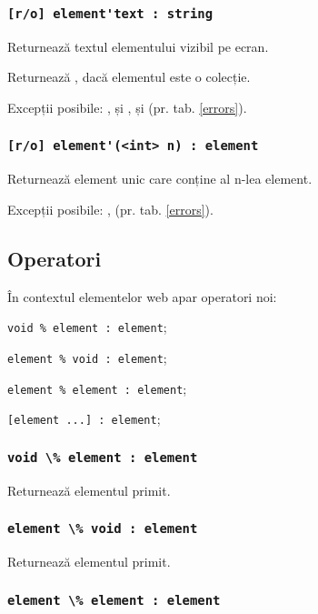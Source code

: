\subsubsection{\lstinline|[r/o] element'text : string|}

Returnează textul elementului vizibil pe ecran. 

\code{[icL]} Returnează \listtype, dacă elementul este o colecție.

Excepții posibile: ,  și ,  și  (pr. tab. \ref{errors}).

\subsubsection{\lstinline|[r/o] element'(<int> n) : element|}

Returnează element unic care conține al n-lea element.

Excepții posibile: ,  (pr. tab. \ref{errors}).

\subsection{Operatori}

În contextul elementelor web apar operatori noi:
\begin{icItems}
	\item \lstinline|void % element : element|;
	\item \lstinline|element % void : element|;
	\item \lstinline|element % element : element|;
	\item \lstinline|[element ...] : element|;
\end{icItems}

\subsubsection{\lstinline|void \% element : element|}

Returnează elementul primit.

\subsubsection{\lstinline|element \% void : element|}

Returnează elementul primit.

\subsubsection{\lstinline|element \% element : element|}

